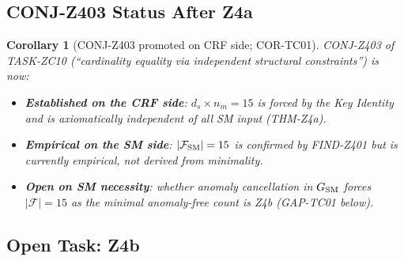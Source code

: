 \documentclass[12pt, a4paper]{article}
\newtheorem{corollary}{Corollary}[section]
\begin{document}
\subsection{CONJ-Z403 Status After Z4a}
\label{sec:conj-status}

\begin{corollary}[CONJ-Z403 promoted on CRF side; COR-TC01]
\label{cor:conj-z403}
CONJ-Z403 of TASK-ZC10 (``cardinality equality via independent
structural constraints'') is now:
\begin{itemize}[leftmargin=*, noitemsep]
  \item \textbf{Established on the CRF side}: $d_s \times n_m = 15$
    is forced by the Key Identity and is axiomatically independent
    of all SM input (THM-Z4a).
  \item \textbf{Empirical on the SM side}: $|\mathcal{F}_{\rm SM}| = 15$
    is confirmed by FIND-Z401 but is currently empirical, not derived
    from minimality.
  \item \textbf{Open on SM necessity}: whether anomaly cancellation
    in $G_{\rm SM}$ \emph{forces} $|\mathcal{F}| = 15$ as the minimal
    anomaly-free count is Z4b (GAP-TC01 below).
\end{itemize}
\end{corollary}

\subsection{Open Task: Z4b}
\label{sec:z4b}
\end{document}
